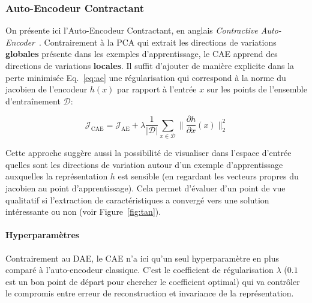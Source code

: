 
\subsubsection{Auto-Encodeur Contractant}

On présente ici l'Auto-Encodeur Contractant, en anglais \textit{Contractive
Auto-Encoder}~\citep{Rifai+al-2011}. Contrairement à la PCA qui extrait les
directions de variations \textbf{globales} présente dans les exemples
d'apprentissage, le CAE apprend des directions de variations \textbf{locales}.
Il suffit d'ajouter de manière explicite dans la perte minimisée
Eq.~\ref{eq:ae} une régularisation qui correspond à la norme du jacobien de
l'encodeur $h(x)$ par rapport à l'entrée $x$ sur les points de l'ensemble
d'entraînement $\mathcal{D}$:

\begin{equation}
\mathcal{J}_\textrm{CAE} = \mathcal{J}_\textrm{AE} + \lambda\frac{1}{\vert \mathcal{D}\vert}\sum_{x\in\mathcal{D}}\| \frac{\partial h}{\partial x}(x)\|_2^2
\label{eq:cae}
\end{equation}

Cette approche suggère aussi la possibilité de visualiser dans l'espace
d'entrée quelles sont les directions de variation autour d'un exemple
d'apprentissage auxquelles la représentation $h$ est sensible  (en regardant
les vecteurs propres du jacobien au point d'apprentissage). Cela permet
d'évaluer d'un point de vue qualitatif si l'extraction de caractéristiques a
convergé vers une solution intéressante ou non (voir Figure~\ref{fig:tan}).

\paragraph{Hyperparamètres} Contrairement au DAE, le CAE n'a ici qu'un seul
hyperparamètre en plus comparé à l'auto-encodeur classique. C'est le
coefficient de régularisation $\lambda$ ($0.1$ est un bon point de départ pour
chercher le coefficient optimal) qui va contrôler le compromis entre
erreur de reconstruction et invariance de la représentation.

